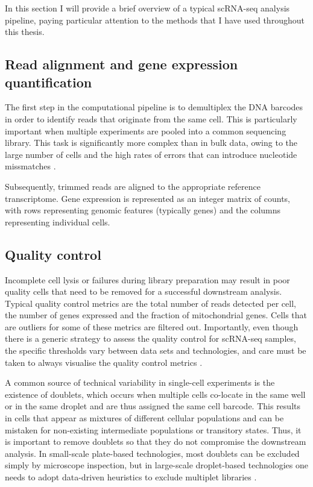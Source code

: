 In this section I will provide a brief overview of a typical scRNA-seq analysis pipeline, paying particular attention to the methods that I have used throughout this thesis.

\subsection{Read alignment and gene expression quantification}

The first step in the computational pipeline is to demultiplex the DNA barcodes in order to identify reads that originate from the same cell. This is particularly important when multiple experiments are pooled into a common sequencing library. This task is significantly more complex than in bulk data, owing to the large number of cells and the high rates of errors that can introduce nucleotide missmatches \cite{Tambe2019}.

Subsequently, trimmed reads are aligned to the appropriate reference transcriptome. Gene expression is represented as an integer matrix of counts, with rows representing genomic features (typically genes) and the columns representing individual cells. 

\subsection{Quality control}

Incomplete cell lysis or failures during library preparation may result in poor quality cells that need to be removed for a successful downstream analysis. Typical quality control metrics are the total number of reads detected per cell, the number of genes expressed and the fraction of mitochondrial genes. Cells that are outliers for some of these metrics are filtered out. Importantly, even though there is a generic strategy to assess the quality control for scRNA-seq samples, the specific thresholds vary between data sets and technologies, and care must be taken to always visualise the quality control metrics \cite{Luecken2019}.

A common source of technical variability in single-cell experiments is the existence of doublets, which occurs when multiple cells co-locate in the same well or in the same droplet and are thus assigned the same cell barcode. This results in cells that appear as mixtures of different cellular populations and can be mistaken for non-existing intermediate populations or transitory states.  Thus, it is important to remove doublets so that they do not compromise the downstream analysis. In small-scale plate-based technologies, most doublets can be excluded simply by microscope inspection, but in large-scale droplet-based technologies one needs to adopt data-driven heuristics to exclude multiplet libraries \cite{McGinnis2019}. 


